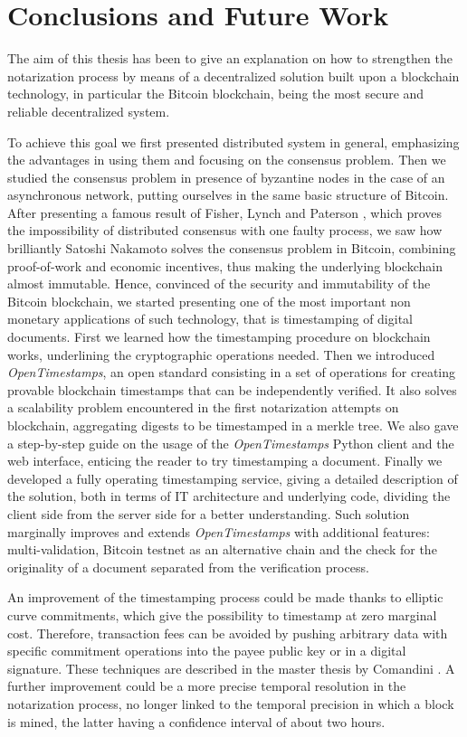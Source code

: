 \chapter{Conclusions and Future Work}
\label{chpr:conclusions}
The aim of this thesis has been to give an explanation on how to strengthen the notarization process by means of a decentralized solution built upon a blockchain technology, in particular the Bitcoin blockchain, being the most secure and reliable decentralized system.

\bigskip
\noindent
To achieve this goal we first presented distributed system in general, emphasizing the advantages in using them and focusing on the consensus problem. Then we studied the consensus problem in presence of byzantine nodes in the case of an asynchronous network, putting ourselves in the same basic structure of Bitcoin. After presenting a famous result of Fisher, Lynch and Paterson \cite{Fischer:1985:IDC:3149.214121}, which proves the impossibility of distributed consensus with one faulty process, we saw how brilliantly Satoshi Nakamoto solves the consensus problem in Bitcoin, combining proof-of-work and economic incentives, thus making the underlying blockchain almost immutable. Hence, convinced of the security and immutability of the Bitcoin blockchain, we started presenting one of the most important non monetary applications of such technology, that is timestamping of digital documents. First we learned how the timestamping procedure on blockchain works, underlining the cryptographic operations needed. Then we introduced \textit{OpenTimestamps}, an open standard consisting in a set of operations for creating provable blockchain timestamps that can be independently verified. It also solves a scalability problem encountered in the first notarization attempts on blockchain, aggregating digests to be timestamped in a merkle tree. We also gave a step-by-step guide on the usage of the \textit{OpenTimestamps} Python client and the web interface, enticing the reader to try timestamping a document. Finally we developed a fully operating timestamping service, giving a detailed description of the solution, both in terms of IT architecture and underlying code, dividing the client side from the server side for a better understanding. Such solution marginally improves and extends \textit{OpenTimestamps} with additional features: multi-validation, Bitcoin testnet as an alternative chain and the check for the originality of a document separated from the verification process.

\bigskip
\noindent
An improvement of the timestamping process could be made thanks to elliptic curve commitments, which give the possibility to timestamp at zero marginal cost. Therefore, transaction fees can be avoided by pushing arbitrary data with specific commitment operations into the payee public key or in a digital signature. These techniques are described in the master thesis by Comandini \cite{Comandini:Thesis:2018}. A further improvement could be a more precise temporal resolution in the notarization process, no longer linked to the temporal precision in which a block is mined, the latter having a confidence interval of about two hours.
